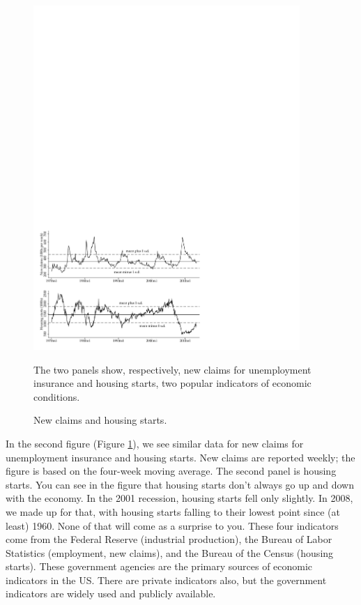\begin{figure}[h!]
    \caption{New claims and housing starts.}
    \label{fig:newclaims_hs}%
    \centering
    \includegraphics[width=0.9\textwidth]{Figures/scorecard_2.pdf}
    \begin{minipage}{0.85\textwidth}
    {\footnotesize The two panels show, respectively,
    new claims for unemployment insurance
    and housing starts, two popular indicators of economic conditions.}
    \end{minipage}
\end{figure}


In the second figure (Figure \ref{fig:newclaims_hs}),
we see similar data for new claims for unemployment insurance
and housing starts.
New claims are reported weekly; the figure is
based on the four-week moving average.
The second panel is housing starts.
You can see in the figure that housing starts don't always go up
and down with the economy.
In the 2001 recession,
housing starts fell only slightly.
In 2008, we made up for that,
with housing starts falling to their lowest point
since (at least) 1960.
None of that will come as a surprise to you.
These four indicators come from the Federal Reserve (industrial production),
the Bureau of Labor Statistics (employment, new claims),
and the Bureau of the Census (housing starts).
These government agencies are the primary sources of economic indicators
in the US.
There are private indicators also,
but the government indicators are widely used and publicly available.


